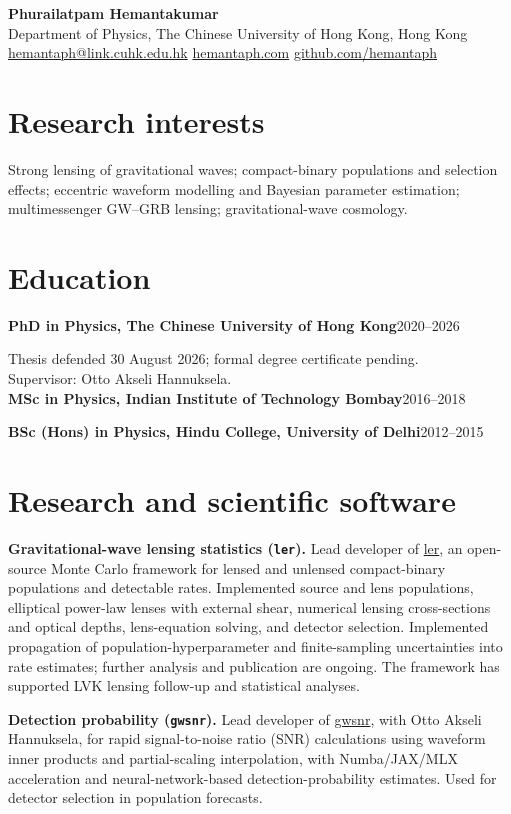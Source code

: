\documentclass[11pt,a4paper]{article}
\newcommand{\entry}[2]{\textbf{#1}\hfill #2\par}
\begin{document}
\begin{center}
{\Large\bfseries Phurailatpam Hemantakumar}\\[3pt]
Department of Physics, The Chinese University of Hong Kong, Hong Kong\\
\href{mailto:hemantaph@link.cuhk.edu.hk}{hemantaph@link.cuhk.edu.hk}\quad
\href{https://hemantaph.com}{hemantaph.com}\quad
\href{https://github.com/hemantaph}{github.com/hemantaph}
\end{center}

\section*{Research interests}
Strong lensing of gravitational waves; compact-binary populations and selection effects; eccentric waveform modelling and Bayesian parameter estimation; multimessenger GW--GRB lensing; gravitational-wave cosmology.

\section*{Education}
\entry{PhD in Physics, The Chinese University of Hong Kong}{2020--2026}
Thesis defended 30 August 2026; formal degree certificate pending.\\
Supervisor: Otto Akseli Hannuksela.\\
\entry{MSc in Physics, Indian Institute of Technology Bombay}{2016--2018}
\entry{BSc (Hons) in Physics, Hindu College, University of Delhi}{2012--2015}

\section*{Research and scientific software}
\textbf{Gravitational-wave lensing statistics (\texttt{ler}).}
Lead developer of \href{https://ler.hemantaph.com/}{ler}, an open-source Monte Carlo framework for lensed and unlensed compact-binary populations and detectable rates. Implemented source and lens populations, elliptical power-law lenses with external shear, numerical lensing cross-sections and optical depths, lens-equation solving, and detector selection. Implemented propagation of population-hyperparameter and finite-sampling uncertainties into rate estimates; further analysis and publication are ongoing. The framework has supported LVK lensing follow-up and statistical analyses.

\textbf{Detection probability (\texttt{gwsnr}).}
Lead developer of \href{https://gwsnr.hemantaph.com/}{gwsnr}, with Otto Akseli Hannuksela, for rapid signal-to-noise ratio (SNR) calculations using waveform inner products and partial-scaling interpolation, with Numba/JAX/MLX acceleration and neural-network-based detection-probability estimates. Used for detector selection in population forecasts.
\end{document}
